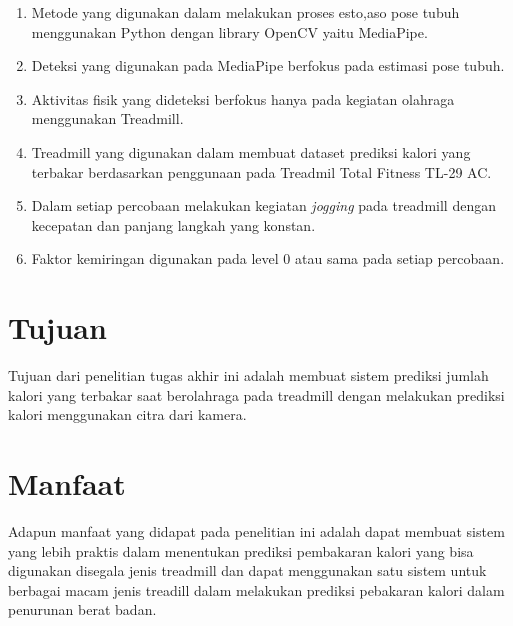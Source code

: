 \begin{enumerate}[nolistsep]

  \item Metode yang digunakan dalam melakukan proses esto,aso pose tubuh menggunakan Python dengan library OpenCV yaitu MediaPipe.

  \item Deteksi yang digunakan pada MediaPipe berfokus pada estimasi pose tubuh.

  \item Aktivitas fisik yang dideteksi berfokus hanya pada kegiatan olahraga menggunakan Treadmill.

  \item Treadmill yang digunakan dalam membuat dataset prediksi kalori yang terbakar berdasarkan penggunaan pada Treadmil Total Fitness TL-29 AC.

  \item Dalam setiap percobaan melakukan kegiatan \emph{jogging} pada treadmill dengan kecepatan dan panjang langkah yang konstan.

  \item Faktor kemiringan digunakan pada level 0 atau sama pada setiap percobaan.

\end{enumerate}

\section{Tujuan}
\label{sec:Tujuan}

Tujuan dari penelitian tugas akhir ini adalah membuat sistem prediksi jumlah kalori yang terbakar saat berolahraga pada treadmill dengan melakukan prediksi kalori menggunakan citra dari kamera.


\section{Manfaat}

Adapun manfaat yang didapat pada penelitian ini adalah dapat membuat sistem yang lebih praktis dalam menentukan prediksi pembakaran kalori yang bisa digunakan disegala jenis treadmill dan dapat menggunakan satu sistem untuk berbagai macam jenis treadill dalam melakukan prediksi pebakaran kalori dalam penurunan berat badan.
